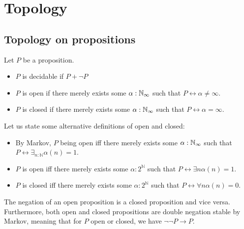 \documentclass{../util/zariski-small}
\begin{document}
\section{Topology}
\subsection{Topology on propositions}
\begin{definition}
  Let $P$ be a proposition. 
  \begin{itemize}
    \item $P$ is decidable if $P + \neg P$
    \item $P$ is open if there merely exists some $\alpha:\mathbb{N}_{\infty}$ such that $P \leftrightarrow \alpha \neq \infty$. 
    \item $P$ is closed if there merely exists some $\alpha:\mathbb{N}_{\infty}$ such that $P \leftrightarrow \alpha = \infty$. 
  \end{itemize}
\end{definition}

\begin{remark}
  Let us state some alternative definitions of open and closed:
  \begin{itemize}
    \item 
      By Markov, $P$ being open iff there merely exists some $\alpha:\mathbb{N}_{\infty}$ such that 
      $P\leftrightarrow \exists_{n:\mathbb N} \alpha(n) = 1$. 
    \item 
      $P$ is open iff there merely exists some $\alpha:2^\mathbb N$ such that $P\leftrightarrow \exists n \alpha(n) = 1$.
    \item 
      $P$ is closed iff there merely exists some $\alpha:2^\mathbb N$ such that $P\leftrightarrow \forall n \alpha(n) = 0$.
\end{itemize}
\end{remark}

\begin{remark}\label{rmkOpenClosedNegation}
  The negation of an open proposition is a closed proposition and vice versa. 
  Furthermore, both open and closed propositions are double negation stable by Markov, 
  meaning that for $P$ open or closed, we have $\neg \neg P \to P$.
\end{remark}
\end{document}

